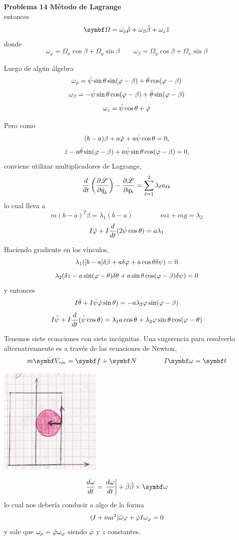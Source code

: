 \documentclass[10pt,oneside]{CBFT_book}
\begin{document}
\begin{ejemplo}{\bf Problema 14 Método de Lagrange}
\[\]
entonces
\[
	\vb{\Omega} = \omega_\rho \hat{\rho} + \omega_\beta \hat{\beta} + \omega_z \hat{z}
\]
donde 
\[
	\omega_\rho = \Omega_x \cos\beta + \Omega_y \sin\beta \qquad 
	\omega_\beta = \Omega_y \cos\beta + \Omega_x \sin\beta 
\]

Luego de algún álgebra
\[
	\omega_\rho = \dot{\psi} \sin\theta \sin(\varphi-\beta) + \dot{\theta} \cos(\varphi-\beta)
\]
\[
	\omega_\beta = -\dot{\psi} \sin\theta \cos(\varphi-\beta) + \dot{\theta} \sin(\varphi-\beta)
\]
\[
	\omega_z = \dot{\psi} \cos\theta + \dot{\varphi}
\]

Pero como
\[
	(b-a) \beta + a \dot{\varphi} + a \dot{\psi} \cos\theta = 0 ,
\]
\[
	\dot{z} -a \dot{\theta} \sin(\varphi-\beta) + a\dot{\psi}\sin\theta\cos(\varphi -\beta) = 0,
\]
conviene utilizar multiplicadores de Lagrange,
\[
	\frac{d^{\hspace{-0.05em}} {}}{d {t}^{\hspace{-0.05em}}}\left( \frac{\partial^{\hspace{-0.05em}} {\mathscr{L}}}{\partial {\dot{q}_k}^{\hspace{-0.05em}}} \right) - \frac{\partial^{\hspace{-0.05em}} {\mathscr{L}}}{\partial {q_k}^{\hspace{-0.05em}}} = \sum_{\ell=1}^2 \lambda_\ell a_{\ell k}
\]
lo cual lleva a 
\[
	m(b-a)^2 \ddot{\beta} = \lambda_1 (b-a) \qquad \qquad 
	m \ddot{z} + m g = \lambda_2
\]
\[
	I \ddot{\varphi} + I \frac{d^{\hspace{-0.05em}} {}}{d {t}^{\hspace{-0.05em}}}( 2 \dot{\psi} \cos\theta ) = a \lambda_1
\]

Haciendo gradiente en los vínculos,
\[
	\lambda_1 ( [b-a] \delta\beta + a\delta\varphi + a\cos\theta\delta\psi) = 0
\]
\[
	\lambda_2 (\delta z - a\sin(\varphi-\theta)\delta\theta + a\sin\theta \cos(\varphi-\beta)\delta\psi) = 0
\]
y entonces
\[
	I \ddot{\theta} +  I \dot{\psi} \dot{\varphi} \sin\theta ) =
	- a \lambda_2 \varphi \sin (\varphi - \beta)
\]
\[
	I \ddot{\psi} +  I \frac{d^{\hspace{-0.05em}} {}}{d {t}^{\hspace{-0.05em}}}( \dot{\psi} \cos\theta ) =
	\lambda_1 a \cos\theta + \lambda_2 \varphi \sin \theta \cos(\varphi - \theta)
\]

Tenemos siete ecuaciones con siete incógnitas. Una sugerencia para resolverlo alternativamente
es a través de las ecuaciones de Newton,
\[
	m\dot{\vb{V}_{cm}} = \vb{f} + \vb{N} \qquad \qquad 
	I \dot{\vb{\omega}} = \vb{t}
\]

\includegraphics[scale=0.5]{images/fig_mc_lagrangebola_2.jpg}

\[
	\dtot{\omega}{t} = \left.\dtot{\omega}{t}\right| + \dot{\beta}\hat{\beta} \times \vb{\omega}
\]
lo cual nos debería conducir a algo de la forma
\[
	(I + ma^2)\ddot{\omega}\varphi + \dot{\varphi} I \omega_\varphi = 0
\]
y sale que $\omega_\rho = \dot{\varphi} \omega_\varphi$ siendo $\dot{\varphi}$ y $\dot{z}$ constantes.

\end{ejemplo}
\end{document}

